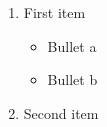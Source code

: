 \documentclass{article}
\begin{document}
\begin{enumerate}
\item First item
\begin{itemize}
\item Bullet a
\item Bullet b
\end{itemize}
\item Second item
\end{enumerate}
\end{document}
